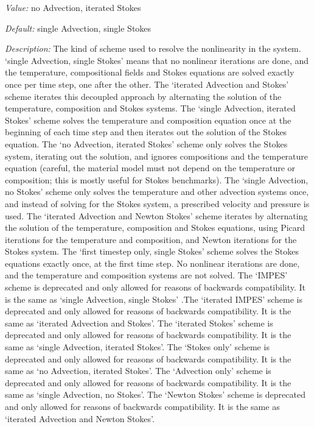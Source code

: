 \begin{itemize}
{\it Value:} no Advection, iterated Stokes


{\it Default:} single Advection, single Stokes


{\it Description:} The kind of scheme used to resolve the nonlinearity in the system. `single Advection, single Stokes' means that no nonlinear iterations are done, and the temperature, compositional fields and Stokes equations are solved exactly once per time step, one after the other. The `iterated Advection and Stokes' scheme iterates this decoupled approach by alternating the solution of the temperature, composition and Stokes systems. The `single Advection, iterated Stokes' scheme solves the temperature and composition equation once at the beginning of each time step and then iterates out the solution of the Stokes equation. The `no Advection, iterated Stokes' scheme only solves the Stokes system, iterating out the solution, and ignores compositions and the temperature equation (careful, the material model must not depend on the temperature or composition; this is mostly useful for Stokes benchmarks). The `single Advection, no Stokes' scheme only solves the temperature and other advection systems once, and instead of solving for the Stokes system, a prescribed velocity and pressure is used. The `iterated Advection and Newton Stokes' scheme iterates by alternating the solution of the temperature, composition and Stokes equations, using Picard iterations for the temperature and composition, and Newton iterations for the Stokes system. The `first timestep only, single Stokes' scheme solves the Stokes equations exactly once, at the first time step. No nonlinear iterations are done, and the temperature and composition systems are not solved. The `IMPES' scheme is deprecated and only allowed for reasons of backwards compatibility. It is the same as `single Advection, single Stokes' .The `iterated IMPES' scheme is deprecated and only allowed for reasons of backwards compatibility. It is the same as `iterated Advection and Stokes'. The `iterated Stokes' scheme is deprecated and only allowed for reasons of backwards compatibility. It is the same as `single Advection, iterated Stokes'. The `Stokes only' scheme is deprecated and only allowed for reasons of backwards compatibility. It is the same as `no Advection, iterated Stokes'. The `Advection only' scheme is deprecated and only allowed for reasons of backwards compatibility. It is the same as `single Advection, no Stokes'. The `Newton Stokes' scheme is deprecated and only allowed for reasons of backwards compatibility. It is the same as `iterated Advection and Newton Stokes'.



\end{itemize}

